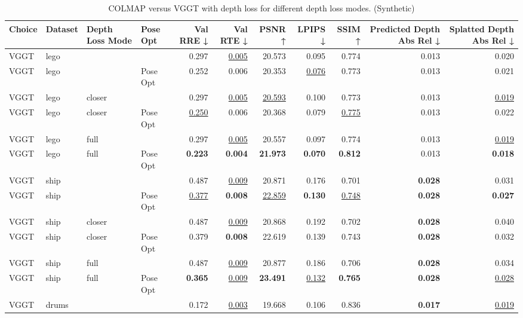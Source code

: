 \begin{table}[H]
\caption{\ifdefined\customcaption \customcaption \else COLMAP versus VGGT with depth loss for different depth loss modes. (Synthetic) \fi}
\label{tab:05_depth_loss_mode_pose_opt_synthetic}
\centering
\scriptsize
\begin{tabular}{llllrrrrrrr}
\toprule
Choice & Dataset & Depth Loss Mode & Pose Opt & Val RRE ↓ & Val RTE ↓ & PSNR ↑ & LPIPS ↓ & SSIM ↑ & Predicted Depth Abs Rel ↓ & Splatted Depth Abs Rel ↓ \\
\midrule
VGGT & lego &  &  & 0.297 & \underline{0.005} & 20.573 & 0.095 & 0.774 & 0.013 & 0.020 \\
VGGT & lego &  & Pose Opt & 0.252 & 0.006 & 20.353 & \underline{0.076} & 0.773 & 0.013 & 0.021 \\
VGGT & lego & closer &  & 0.297 & \underline{0.005} & \underline{20.593} & 0.100 & 0.773 & 0.013 & \underline{0.019} \\
VGGT & lego & closer & Pose Opt & \underline{0.250} & 0.006 & 20.368 & 0.079 & \underline{0.775} & 0.013 & 0.022 \\
VGGT & lego & full &  & 0.297 & \underline{0.005} & 20.557 & 0.097 & 0.774 & 0.013 & \underline{0.019} \\
VGGT & lego & full & Pose Opt & \textbf{0.223} & \textbf{0.004} & \textbf{21.973} & \textbf{0.070} & \textbf{0.812} & 0.013 & \textbf{0.018} \\
\midrule
VGGT & ship &  &  & 0.487 & \underline{0.009} & 20.871 & 0.176 & 0.701 & \textbf{0.028} & 0.031 \\
VGGT & ship &  & Pose Opt & \underline{0.377} & \textbf{0.008} & \underline{22.859} & \textbf{0.130} & \underline{0.748} & \textbf{0.028} & \textbf{0.027} \\
VGGT & ship & closer &  & 0.487 & \underline{0.009} & 20.868 & 0.192 & 0.702 & \textbf{0.028} & 0.040 \\
VGGT & ship & closer & Pose Opt & 0.379 & \textbf{0.008} & 22.619 & 0.139 & 0.743 & \textbf{0.028} & 0.032 \\
VGGT & ship & full &  & 0.487 & \underline{0.009} & 20.877 & 0.186 & 0.706 & \textbf{0.028} & 0.034 \\
VGGT & ship & full & Pose Opt & \textbf{0.365} & \underline{0.009} & \textbf{23.491} & \underline{0.132} & \textbf{0.765} & \textbf{0.028} & \underline{0.028} \\
\midrule
VGGT & drums &  &  & 0.172 & \underline{0.003} & 19.668 & 0.106 & 0.836 & \textbf{0.017} & \underline{0.019} \\

\end{tabular}
\end{table}
